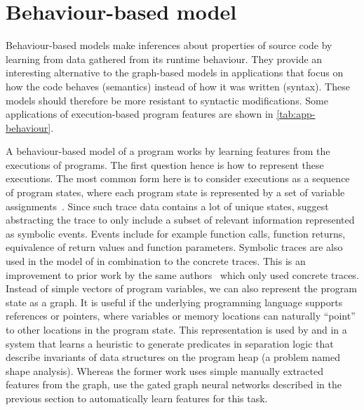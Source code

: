 \documentclass[sigconf,authordraft=true,nonacm=true]{acmart}
\begin{document}
\section{Behaviour-based model}
Behaviour-based models make inferences about properties of source code by learning from data gathered from its runtime behaviour.
They provide an interesting alternative to the graph-based models in applications that focus on how the code behaves (semantics) instead of how it was written (syntax).
These models should therefore be more resistant to syntactic modifications.
Some applications of execution-based program features are shown in \cref{tab:app-behaviour}.

A behaviour-based model of a program works by learning features from the executions of programs.
The first question hence is how to represent these executions.
The most common form here is to consider executions as a sequence of program states, where each program state is represented by a set of variable assignments~\cite{yao_learning_2020,wang_learning_2019,padhi_data-driven_2016,piech_learning_2015,paasen_execution_2016}.
Since such trace data contains a lot of unique states, \citet{henkel_code_2018} suggest abstracting the trace to only include a subset of relevant information represented as symbolic events.
Events include for example function calls, function returns, equivalence of return values and function parameters.
Symbolic traces are also used in the model of \citet{wang_learning_2019-1} in combination to the concrete traces.
This is an improvement to prior work by the same authors~\cite{wang_learning_2019} which only used concrete traces.
Instead of simple vectors of program variables, we can also represent the program state as a graph.
It is useful if the underlying programming language supports references or pointers, where variables or memory locations can naturally ``point'' to other locations in the program state.
This representation is used by \citet{brockschmidt_learning_2017} and \citet{li_gated_2017} in a system that learns a heuristic to generate predicates in separation logic that describe invariants of data structures on the program heap (a problem named shape analysis).
Whereas the former work uses simple manually extracted features from the graph, \citet{li_gated_2017} use the gated graph neural networks described in the previous section to automatically learn features for this task.
\end{document}
